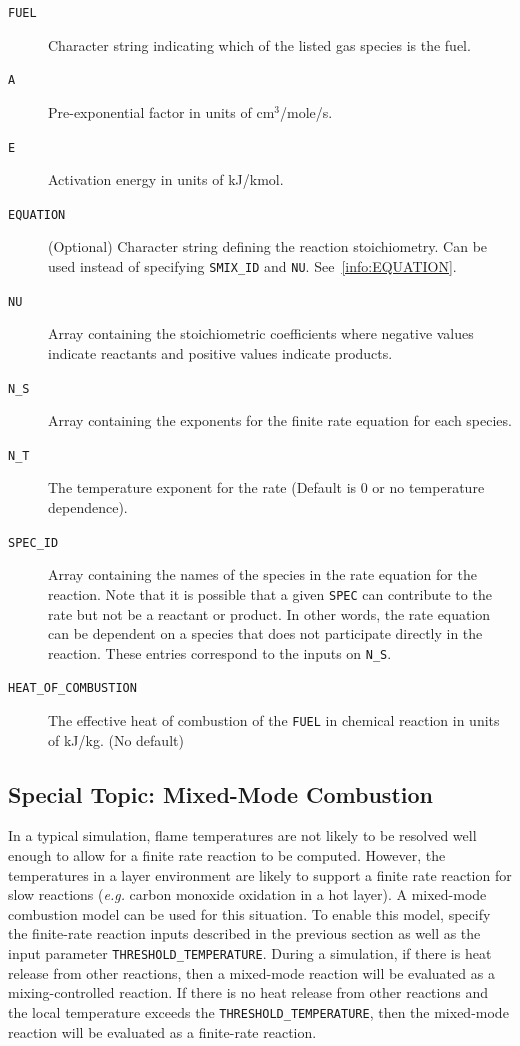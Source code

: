 \documentclass[11pt]{book}
\newcommand{\ct}{\tt\small}
\begin{document}
\begin{description}
\item[{\ct FUEL}] Character string indicating which of the listed gas species is the fuel.
\item[{\ct A}] Pre-exponential factor in units of cm$^3$/mole/s.
\item[{\ct E}] Activation energy in units of kJ/kmol.
\item[{\ct EQUATION}] (Optional) Character string defining the reaction stoichiometry.  Can be used instead of specifying {\ct SMIX\_ID} and {\ct NU}.  See~\ref{info:EQUATION}.
\item[{\ct NU}] Array containing the stoichiometric coefficients where negative values indicate reactants and positive values indicate products.
\item[{\ct N\_S}] Array containing the exponents for the finite rate equation for each species.
\item[{\ct N\_T}] The temperature exponent for the rate (Default is 0 or no temperature dependence).
\item[{\ct SPEC\_ID}] Array containing the names of the species in the rate equation for the reaction. Note that it is possible that a given {\ct SPEC} can
contribute to the rate but not be a reactant or product. In other words,
the rate equation can be dependent on a species that does not participate directly in the reaction. These entries correspond to the inputs on {\ct N\_S}.
\item[{\ct HEAT\_OF\_COMBUSTION}] The effective heat of combustion of the {\ct FUEL} in chemical reaction in units of kJ/kg. (No default)
\end{description}



\subsection{Special Topic: Mixed-Mode Combustion}
\label{info:mixedmode}

In a typical simulation, flame temperatures are not likely to be resolved well enough to allow for a finite rate reaction to be computed.
However, the temperatures in a layer environment are likely to support a finite rate reaction for slow reactions ({\em e.g.} carbon monoxide oxidation in a hot layer).
A mixed-mode combustion model can be used for this situation.  To enable this model, specify the finite-rate reaction inputs described in the previous section
as well as the input parameter {\ct THRESHOLD\_TEMPERATURE}.  During a simulation, if there is heat release from other reactions,
then a mixed-mode reaction will be evaluated as a mixing-controlled reaction.  If there is no heat release from other reactions and the local
temperature exceeds the {\ct THRESHOLD\_TEMPERATURE}, then the mixed-mode reaction will be evaluated as a finite-rate reaction.
\end{document}
